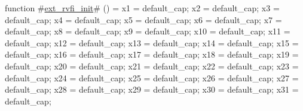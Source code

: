 function #\hyperref[sailRISCVzextzyrvfizyinit]{ext\_rvfi\_init}# () = {
  x1  = default_cap;
  x2  = default_cap;
  x3  = default_cap;
  x4  = default_cap;
  x5  = default_cap;
  x6  = default_cap;
  x7  = default_cap;
  x8  = default_cap;
  x9  = default_cap;
  x10 = default_cap;
  x11 = default_cap;
  x12 = default_cap;
  x13 = default_cap;
  x14 = default_cap;
  x15 = default_cap;
  x16 = default_cap;
  x17 = default_cap;
  x18 = default_cap;
  x19 = default_cap;
  x20 = default_cap;
  x21 = default_cap;
  x22 = default_cap;
  x23 = default_cap;
  x24 = default_cap;
  x25 = default_cap;
  x26 = default_cap;
  x27 = default_cap;
  x28 = default_cap;
  x29 = default_cap;
  x30 = default_cap;
  x31 = default_cap;
}
